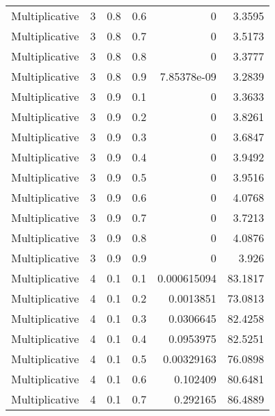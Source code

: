 \documentclass{article}
\begin{document}
\begin{longtable}[H]{lrrrrr}
 Multiplicative &       3 &   0.8 &            0.6 &      0           &          3.3595 \\
 Multiplicative &       3 &   0.8 &            0.7 &      0           &          3.5173 \\
 Multiplicative &       3 &   0.8 &            0.8 &      0           &          3.3777 \\
 Multiplicative &       3 &   0.8 &            0.9 &      7.85378e-09 &          3.2839 \\
 Multiplicative &       3 &   0.9 &            0.1 &      0           &          3.3633 \\
 Multiplicative &       3 &   0.9 &            0.2 &      0           &          3.8261 \\
 Multiplicative &       3 &   0.9 &            0.3 &      0           &          3.6847 \\
 Multiplicative &       3 &   0.9 &            0.4 &      0           &          3.9492 \\
 Multiplicative &       3 &   0.9 &            0.5 &      0           &          3.9516 \\
 Multiplicative &       3 &   0.9 &            0.6 &      0           &          4.0768 \\
 Multiplicative &       3 &   0.9 &            0.7 &      0           &          3.7213 \\
 Multiplicative &       3 &   0.9 &            0.8 &      0           &          4.0876 \\
 Multiplicative &       3 &   0.9 &            0.9 &      0           &          3.926  \\
 Multiplicative &       4 &   0.1 &            0.1 &      0.000615094 &         83.1817 \\
 Multiplicative &       4 &   0.1 &            0.2 &      0.0013851   &         73.0813 \\
 Multiplicative &       4 &   0.1 &            0.3 &      0.0306645   &         82.4258 \\
 Multiplicative &       4 &   0.1 &            0.4 &      0.0953975   &         82.5251 \\
 Multiplicative &       4 &   0.1 &            0.5 &      0.00329163  &         76.0898 \\
 Multiplicative &       4 &   0.1 &            0.6 &      0.102409    &         80.6481 \\
 Multiplicative &       4 &   0.1 &            0.7 &      0.292165    &         86.4889 \\

\end{longtable}
\end{document}
